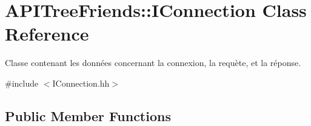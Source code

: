 \hypertarget{class_a_p_i_tree_friends_1_1_i_connection}{}\section{A\+P\+I\+Tree\+Friends\+:\+:I\+Connection Class Reference}
\label{class_a_p_i_tree_friends_1_1_i_connection}


Classe contenant les données concernant la connexion, la requète, et la réponse.  




{\ttfamily \#include $<$I\+Connection.\+hh$>$}

\subsection*{Public Member Functions}
